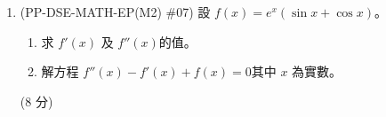 \documentclass[12pt]{article}
\begin{document}
\begin{enumerate}
            \hrulefill
            
            \hrulefill
            
            \hrulefill
            
            \hrulefill
            
            \hrulefill
            
            \hrulefill
            
            \hrulefill
            
            \hrulefill
            
            \hrulefill
            
            \hrulefill
            
            \hrulefill
            
            \hrulefill
            
            \hrulefill
            
            \hrulefill
            
            \hrulefill
            
            \hrulefill
            
            \hrulefill
            
            \hrulefill

        \pagebreak
        \item (PP-DSE-MATH-EP(M2) \#07) 設 $f(x)=e^x(\sin{x}+\cos{x})$。\begin{enumerate}
            \item 求 $f'(x)$ 及 $f''(x)$的值。
            \item 解方程 $f''(x)-f'(x)+f(x)=0$其中 $x$ 為實數。
        \end{enumerate}\hfill(8 分)
        
        \hrulefill
            
            \hrulefill
            
            \hrulefill
            
            \hrulefill
            
            \hrulefill
            
            \hrulefill
            
            \hrulefill
            
            \hrulefill
            
            \hrulefill
            
            \hrulefill
            

\end{enumerate}
\end{document}
